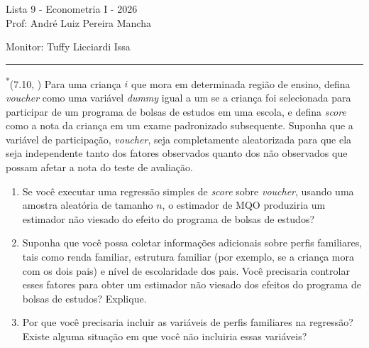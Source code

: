 \documentclass[12pt,letterpaper, onecolumn]{exam}
\begin{document}
\begingroup
    \centering
    \LARGE Lista 9 - Econometria I - 2026\\[0.5em]
    \large Prof: André Luiz Pereira Mancha \par
    \large Monitor: Tuffy Licciardi Issa \par
\endgroup
\rule{\textwidth}{0.4pt}
\pointsdroppedatright
\printanswers
\renewcommand{\solutiontitle}{\noindent\textbf{Ans:}\enspace}
\newcommand{\qstar}{\hspace{-0.6em}\textsuperscript{*}\hspace{0.2em}}

\begin{questions}

\question\qstar (7.10, \citep{wooldridge2016}) Para uma criança \(i\) que mora em determinada região de ensino, defina \textit{voucher} como uma variável \textit{dummy} igual a um se a criança foi selecionada para participar de um programa de bolsas de estudos em uma escola, e defina \textit{score} como a nota da criança em um exame padronizado subsequente. Suponha que a variável de participação, \textit{voucher}, seja completamente aleatorizada para que ela seja independente tanto dos fatores observados quanto dos não observados que possam afetar a nota do teste de avaliação.
\begin{enumerate}[label=(\roman*)]
    \item Se você executar uma regressão simples de \textit{score} sobre \textit{voucher}, usando uma amostra aleatória de tamanho \(n\), o estimador de MQO produziria um estimador não viesado do efeito do programa de bolsas de estudos?
    \item Suponha que você possa coletar informações adicionais sobre perfis familiares, tais como renda familiar, estrutura familiar (por exemplo, se a criança mora com os dois pais) e nível de escolaridade dos pais. Você precisaria controlar esses fatores para obter um estimador não viesado dos efeitos do programa de bolsas de estudos? Explique.
    \item Por que você precisaria incluir as variáveis de perfis familiares na regressão? Existe alguma situação em que você não incluiria essas variáveis?
\end{enumerate}

\vspace{0.7cm}


\end{questions}
\end{document}
